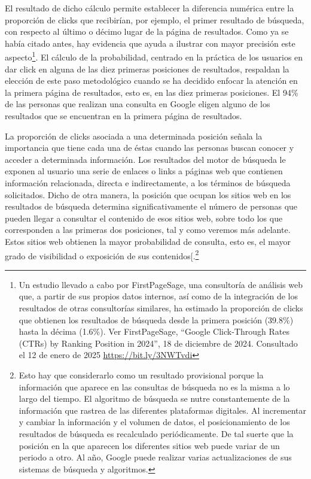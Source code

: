 \documentclass[
]{interact}
\begin{document}
El resultado de dicho cálculo permite establecer la diferencia numérica
entre la proporción de clicks que recibirían, por ejemplo, el primer
resultado de búsqueda, con respecto al último o décimo lugar de la
página de resultados. Como ya se había citado antes, hay evidencia que
ayuda a ilustrar con mayor precisión este aspecto\footnote{Un estudio
  llevado a cabo por FirstPageSage, una consultoría de análisis web que,
  a partir de sus propios datos internos, así como de la integración de
  los resultados de otras consultorías similares, ha estimado la
  proporción de clicks que obtienen los resultados de búsqueda desde la
  primera posición (39.8\%) hasta la décima (1.6\%). Ver FirstPageSage,
  ``Google Click-Through Rates (CTRs) by Ranking Position in 2024'', 18
  de diciembre de 2024. Consultado el 12 de enero de 2025
  \href{https://bit.ly/3NWTvdi}{\ul{https://bit.ly/3NWTvdi}}}. El
cálculo de la probabilidad, centrado en la práctica de los usuarios en
dar click en alguna de las diez primeras posiciones de resultados,
respaldan la elección de este paso metodológico cuando se ha decidido
enfocar la atención en la primera página de resultados, esto es, en las
diez primeras posiciones. El 94\% de las personas que realizan una
consulta en Google eligen alguno de los resultados que se encuentran en
la primera página de resultados.

La proporción de clicks asociada a una determinada posición señala la
importancia que tiene cada una de éstas cuando las personas buscan
conocer y acceder a determinada información. Los resultados del motor de
búsqueda le exponen al usuario una serie de enlaces o links a páginas
web que contienen información relacionada, directa e indirectamente, a
los términos de búsqueda solicitados. Dicho de otra manera, la posición
que ocupan los sitios web en los resultados de búsqueda determina
significativamente el número de personas que pueden llegar a consultar
el contenido de esos sitios web, sobre todo los que corresponden a las
primeras dos posiciones, tal y como veremos más adelante. Estos sitios
web obtienen la mayor probabilidad de consulta, esto es, el mayor grado
de visibilidad o exposición de sus contenidos{[}.\footnote{Esto hay que
  considerarlo como un resultado provisional porque la información que
  aparece en las consultas de búsqueda no es la misma a lo largo del
  tiempo. El algoritmo de búsqueda se nutre constantemente de la
  información que rastrea de las diferentes plataformas digitales. Al
  incrementar y cambiar la información y el volumen de datos, el
  posicionamiento de los resultados de búsqueda es recalculado
  periódicamente. De tal suerte que la posición en la que aparecen los
  diferentes sitios web puede variar de un periodo a otro. Al año,
  Google puede realizar varias actualizaciones de sus sistemas de
  búsqueda y algoritmos.}
\end{document}

